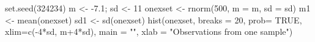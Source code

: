 \begin{Schunk}
\begin{Sinput}
  set.seed(324234)
  m <- -7.1; sd <- 11
  onexset <- rnorm(500, m = m, sd = sd)
  m1 <- mean(onexset)
  sd1 <- sd(onexset)
  hist(onexset, breaks = 20, prob= TRUE, xlim=c(-4*sd, m+4*sd), main = "", xlab = "Observations from one sample")
\end{Sinput}
\end{Schunk}
